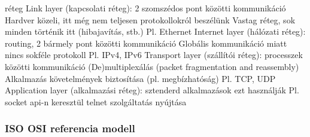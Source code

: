 \documentclass[12pt,a4paper]{article}
\begin{document}
\begin{outline}
	 réteg
	\1 Link layer (kapcsolati réteg): 2 szomszédos pont közötti kommunikáció
		\2 Hardver közeli, itt még nem teljesen protokollokról beszélünk
		\2 Vastag réteg, sok minden történik itt (hibajavítás, stb.)
		\2 Pl. Ethernet
	\1 Internet layer (hálózati réteg): routing, 2 bármely pont közötti kommunikáció
		\2 Globális kommunikáció miatt nincs sokféle protokoll
		\2 Pl. IPv4, IPv6
	\1 Transport layer (szállítói réteg): processzek közötti kommunikáció
		\2 (De)multiplexálás (packet fragmentation and reassembly)
		\2 Alkalmazás követelmények biztosítása (pl. megbízhatóság)
		\2 Pl. TCP, UDP
	\1 Application layer (alkalmazási réteg): sztenderd alkalmazások ezt használják
		\2 Pl. socket api-n keresztül telnet szolgáltatás nyújtása
\end{outline}

\pagebreak

\subsubsection{ISO OSI referencia modell}
\end{document}
